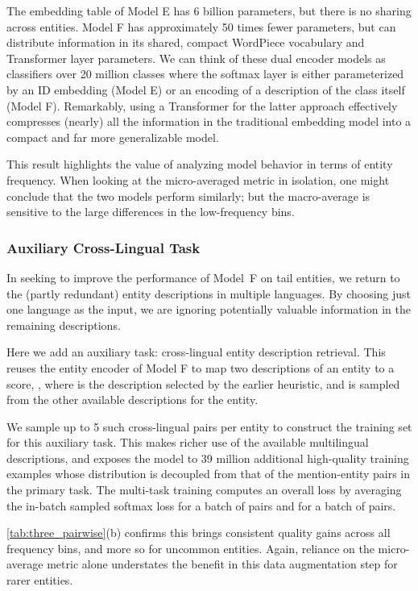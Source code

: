 \documentclass[11pt,a4paper]{article}
\begin{document}
The embedding table of Model E has 6 billion parameters, but there is no sharing across entities.
Model F has approximately 50 times fewer parameters, but can distribute information in its shared, compact WordPiece vocabulary and Transformer layer parameters.
We can think of these dual encoder models as classifiers over 20 million classes where the softmax layer is either parameterized by an ID embedding (Model E) or an encoding of a description of the class itself (Model F).
Remarkably, using a Transformer for the latter approach effectively compresses (nearly) all the information in the traditional embedding model into a compact and far more generalizable model.

This result highlights the value of analyzing model behavior in terms of entity frequency.
When looking at the micro-averaged metric in isolation, one might conclude that the two models perform similarly;
but the macro-average is sensitive to the large differences in the low-frequency bins.


\subsubsection{Auxiliary Cross-Lingual Task}
In seeking to improve the performance of Model~F on tail entities, we return to the (partly redundant) entity descriptions in multiple languages.
By choosing just one language as the input, we are ignoring potentially valuable information in the remaining descriptions.

Here we add an auxiliary task: cross-lingual entity description retrieval.
This reuses the entity encoder  of Model F to map two descriptions of an entity  to a score, ,
where  is the description selected by the earlier heuristic,
and  is sampled from the other available descriptions for the entity.

We sample up to 5 such cross-lingual pairs per entity to construct the training set for this auxiliary task.
This makes richer use of the available multilingual descriptions, and exposes the model to
39 million additional high-quality training examples whose distribution is decoupled from that of the mention-entity pairs in the primary task.
The multi-task training computes an overall loss by averaging the in-batch sampled softmax loss for a batch of  pairs and for a batch of  pairs.

\autoref{tab:three_pairwise}(b) confirms this brings consistent quality gains across all frequency bins, and more so for uncommon entities. Again, reliance on the micro-average metric alone understates the benefit in this data augmentation step for rarer entities.
\end{document}
